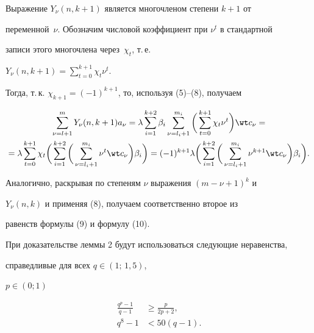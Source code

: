 \begin{pf}


Выражение $Y_{\nu} (n, k+1)$ является многочленом степени $k+1$ от 


переменной~$\nu$. Обозначим числовой коэффициент при $\nu^t$ в стандартной 


записи этого многочлена через~$\chi_t$, т.\,е. 


$Y_{\nu} (n, k+1)=\sum\limits_{t=0}^{k+1} \chi_t \nu^t$.


Тогда, т.\,к. $\chi_{k+1}=(-1)^{k+1}$, то, используя (5)--(8), получаем


\begin{multline*}


\sum\limits_{\nu=l+1}^m Y_{\nu}(n, k+1)a_{\nu}=\lambda


\sum\limits_{i=1}^{k+2}\beta_i\sum\limits_{\nu=l_i+1}^{m_i}


\bigg(\sum\limits_{t=0}^{k+1} \chi_t\nu^t\bigg) \wt c_{\nu}= \\


%


=\lambda\sum\limits_{t=0}^{k+1}\chi_t\bigg(\sum\limits_{i=1}^{k+2}


\bigg(\sum\limits_{\nu=l_i+1}^{m_i} \nu^t 


\wt c_{\nu}\bigg)\beta_i\bigg)=(-1)^{k+1}\lambda


\bigg(\sum\limits_{i=1}^{k+2}\bigg(\sum\limits_{\nu=l_i+1}^{m_i} 


\nu^{k+1} \wt c_{\nu}\bigg) \beta_i\bigg). 


\end{multline*}





Аналогично, раскрывая по степеням $\nu$ выражения $(m-\nu+1)^k$ и 


$Y_{\nu} (n, k)$ и применяя (8), получаем соответственно второе из 


равенств формулы (9) и формулу (10). 


\end{pf}





При доказательстве леммы 2 будут использоваться следующие неравенства, 


справедливые для всех $q \in (1;\, 1{,}5)$,   %


$p \in (0; 1)$


\begin{align}


\frac{q^p-1}{q-1} &\ge \frac{p}{2p+2},\\


q^8-1&<50(q-1).


\end{align}


